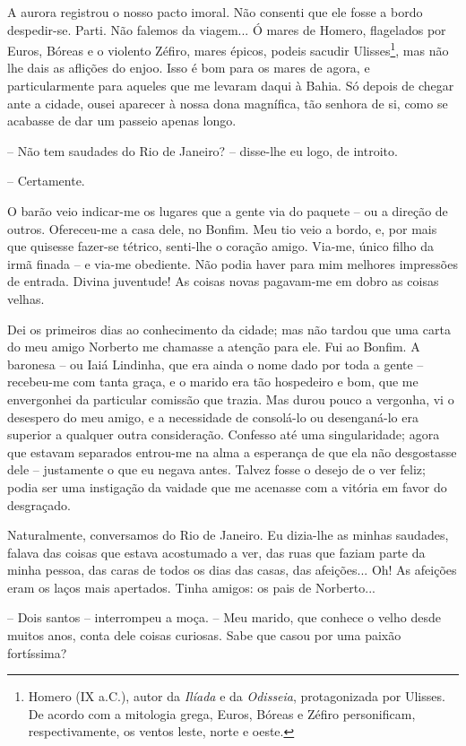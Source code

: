 A aurora registrou o nosso pacto imoral. Não consenti que ele fosse a
bordo despedir-se. Parti. Não falemos da viagem... Ó mares de Homero,
flagelados por Euros, Bóreas e o violento Zéfiro, mares épicos, podeis
sacudir Ulisses\footnote{Homero (IX a.C.), autor da \emph{Ilíada} e da
  \emph{Odisseia}, protagonizada por Ulisses. De acordo com a mitologia
  grega, Euros, Bóreas e Zéfiro personificam, respectivamente, os ventos
  leste, norte e oeste.}, mas não lhe dais as aflições do enjoo. Isso é
bom para os mares de agora, e particularmente para aqueles que me
levaram daqui à Bahia. Só depois de chegar ante a cidade, ousei aparecer
à nossa dona magnífica, tão senhora de si, como se acabasse de dar um
passeio apenas longo.

-- Não tem saudades do Rio de Janeiro? -- disse-lhe eu logo, de
introito.

-- Certamente.

O barão veio indicar-me os lugares que a gente via do paquete -- ou a
direção de outros. Ofereceu-me a casa dele, no Bonfim. Meu tio veio a
bordo, e, por mais que quisesse fazer-se tétrico, senti-lhe o coração
amigo. Via-me, único filho da irmã finada -- e via-me obediente. Não
podia haver para mim melhores impressões de entrada. Divina juventude!
As coisas novas pagavam-me em dobro as coisas velhas.

Dei os primeiros dias ao conhecimento da cidade; mas não tardou que uma
carta do meu amigo Norberto me chamasse a atenção para ele. Fui ao
Bonfim. A baronesa -- ou Iaiá Lindinha, que era ainda o nome dado por
toda a gente -- recebeu-me com tanta graça, e o marido era tão
hospedeiro e bom, que me envergonhei da particular comissão que trazia.
Mas durou pouco a vergonha, vi o desespero do meu amigo, e a necessidade
de consolá-lo ou desenganá-lo era superior a qualquer outra
consideração. Confesso até uma singularidade; agora que estavam
separados entrou-me na alma a esperança de que ela não desgostasse dele
-- justamente o que eu negava antes. Talvez fosse o desejo de o ver
feliz; podia ser uma instigação da vaidade que me acenasse com a vitória
em favor do desgraçado.

Naturalmente, conversamos do Rio de Janeiro. Eu dizia-lhe as minhas
saudades, falava das coisas que estava acostumado a ver, das ruas que
faziam parte da minha pessoa, das caras de todos os dias das casas, das
afeições... Oh! As afeições eram os laços mais apertados. Tinha amigos:
os pais de Norberto...

-- Dois santos -- interrompeu a moça. -- Meu marido, que conhece o velho
desde muitos anos, conta dele coisas curiosas. Sabe que casou por uma
paixão fortíssima?

